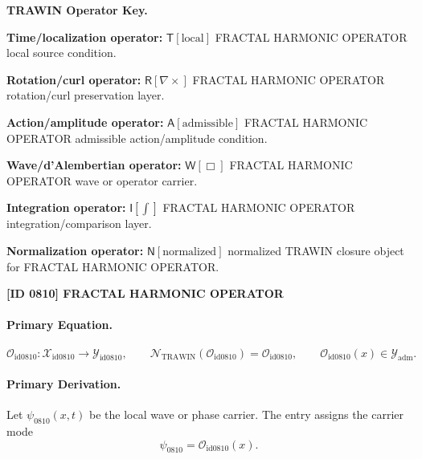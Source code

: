 \par\vspace{0.45\baselineskip}
\noindent\begin{minipage}[t]{\linewidth}
\begingroup
\small
\raggedright
\textbf{TRAWIN Operator Key.}\par
\noindent\textbf{Time/localization operator:} $\mathsf{T}\!\left[\mathrm{local}\right]$ FRACTAL HARMONIC OPERATOR local source condition.\par
\noindent\textbf{Rotation/curl operator:} $\mathsf{R}\!\left[\nabla\times\right]$ FRACTAL HARMONIC OPERATOR rotation/curl preservation layer.\par
\noindent\textbf{Action/amplitude operator:} $\mathsf{A}\!\left[\mathrm{admissible}\right]$ FRACTAL HARMONIC OPERATOR admissible action/amplitude condition.\par
\noindent\textbf{Wave/d'Alembertian operator:} $\mathsf{W}\!\left[\Box\right]$ FRACTAL HARMONIC OPERATOR wave or operator carrier.\par
\noindent\textbf{Integration operator:} $\mathsf{I}\!\left[\int\right]$ FRACTAL HARMONIC OPERATOR integration/comparison layer.\par
\noindent\textbf{Normalization operator:} $\mathsf{N}\!\left[\mathrm{normalized}\right]$ normalized TRAWIN closure object for FRACTAL HARMONIC OPERATOR.\par
\endgroup
\end{minipage}

\clearpage
\noindent\textbf{[ID 0810] FRACTAL HARMONIC OPERATOR}\par
\vspace{0.35em}
\paragraph{Primary Equation.}
\[
\mathcal{O}_{\mathrm{id0810}}:\mathcal{X}_{\mathrm{id0810}}\longrightarrow \mathcal{Y}_{\mathrm{id0810}},\qquad
\mathcal{N}_{\mathrm{TRAWIN}}(\mathcal{O}_{\mathrm{id0810}})=\mathcal{O}_{\mathrm{id0810}},\qquad
\mathcal{O}_{\mathrm{id0810}}(x)\in\mathcal{Y}_{\mathrm{adm}}.
\]

\paragraph{Primary Derivation.} Let $\psi_{0810}(x,t)$ be the local wave or phase carrier.  The entry assigns the carrier mode\[
\psi_{0810}=\mathcal{O}_{\mathrm{id0810}}(x).
\]

